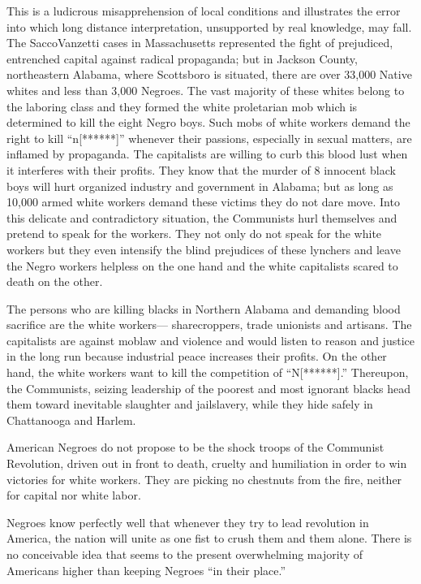 \documentclass[letterpaper,10pt,english]{jupyterBook}
\begin{document}
\sphinxAtStartPar
This is a ludicrous misapprehension of local conditions and illustrates the error into which long distance interpretation, unsupported by real knowledge, may fall. The Sacco\sphinxhyphen{}Vanzetti cases in Massachusetts represented the fight of prejudiced, entrenched capital against radical propaganda; but in Jackson County, northeastern Alabama, where Scottsboro is situated, there are over 33,000 Native whites and less than 3,000 Negroes. The vast majority of these whites belong to the laboring class and they formed the white proletarian mob which is determined to kill the eight Negro boys. Such mobs of white workers demand the right to kill “n{[}******{]}” whenever their passions, especially in sexual matters, are inflamed by propaganda. The capitalists are willing to curb this blood lust when it interferes with their profits. They know that the murder of 8 innocent black boys will hurt organized industry and government in Alabama; but as long as 10,000 armed white workers demand these victims they do not dare move. Into this delicate and contradictory situation, the Communists hurl themselves and pretend to speak for the workers. They not only do not speak for the white workers but they even intensify the blind prejudices of these lynchers and leave the Negro workers helpless on the one hand and the white capitalists scared to death on the other.

\sphinxAtStartPar
The persons who are killing blacks in Northern Alabama and demanding blood sacrifice are the white workers— sharecroppers, trade unionists and artisans. The capitalists are against mob\sphinxhyphen{}law and violence and would listen to reason and justice in the long run because industrial peace increases their profits. On the other hand, the white workers want to kill the competition of “N{[}******{]}.” Thereupon, the Communists, seizing leadership of the poorest and most ignorant blacks head them toward inevitable slaughter and jail\sphinxhyphen{}slavery, while they hide safely in Chattanooga and Harlem.

\sphinxAtStartPar
American Negroes do not propose to be the shock troops of the Communist Revolution, driven out in front to death, cruelty and humiliation in order to win victories for white workers. They are picking no chestnuts from the fire, neither for capital nor white labor.

\sphinxAtStartPar
Negroes know perfectly well that whenever they try to lead revolution in America, the nation will unite as one fist to crush them and them alone. There is no conceivable idea that seems to the present overwhelming majority of Americans higher than keeping Negroes “in their place.”
\end{document}
